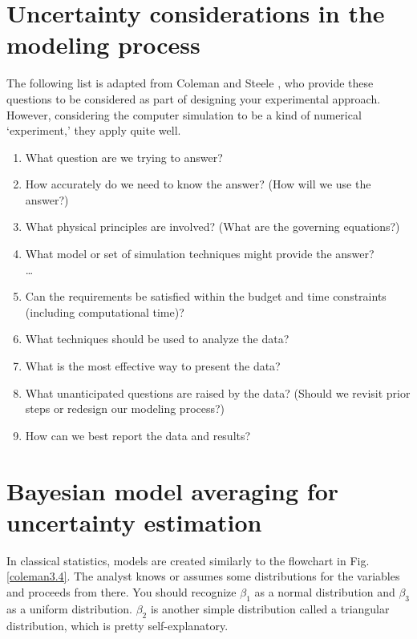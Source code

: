 \documentclass[10pt]{article}
\begin{document}
\section{Uncertainty considerations in the modeling process}

The following list is adapted from Coleman and Steele \cite{Coleman2009-wb}, who provide these questions to be considered as part of designing your experimental approach. However, considering the computer simulation to be a kind of numerical `experiment,' they apply quite well.

\begin{enumerate}
    \item What question are we trying to answer?
    \item How accurately do we need to know the answer? (How will we use the answer?)
    \item What physical principles are involved? (What are the governing equations?)
    \item What model or set of simulation techniques might provide the answer?\\
    \ldots
    \item Can the requirements be satisfied within the budget and time constraints (including computational time)?
    \item What techniques should be used to analyze the data?
    \item What is the most effective way to present the data?
    \item What unanticipated questions are raised by the data? (Should we revisit prior steps or redesign our modeling process?)
    \item How can we best report the data and results?    
\end{enumerate}
    


\section{Bayesian model averaging for uncertainty estimation}

In classical statistics, models are created similarly to the flowchart in Fig. \ref{coleman3.4}. The analyst knows or assumes some distributions for the variables and proceeds from there. You should recognize $ \beta_1 $ as a normal distribution and $\beta_3$ as a uniform distribution. $\beta_2$ is another simple distribution called a triangular distribution, which is pretty self-explanatory.
\end{document}

